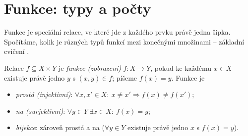 \documentclass[11pt,a4paper]{article}
\begin{document}
\section{Funkce: typy a počty}

Funkce je speciální relace, ve které jde z každého prvku právě jedna šipka. Spočítáme, kolik je různých typů funkcí mezi konečnými množinami -- základní cvičení .

\begin{definice}
Relace $f\subseteq X\times Y$ je \emph{funkce (zobrazení)} $f\colon X\to Y$, pokud ke každému $x\in X$ existuje právě jedno $y$ s $(x,y)\in f$; píšeme $f(x)=y$. Funkce je
\begin{itemize}
  \item \emph{prostá (injektivní)}: $\forall x,x'\in X:\ x\neq x'\Rightarrow f(x)\neq f(x')$;
  \item \emph{na (surjektivní)}: $\forall y\in Y\ \exists x\in X:\ f(x)=y$;
  \item \emph{bijekce}: zároveň prostá a na ($\forall y\in Y$ existuje právě jedno $x$ s $f(x)=y$).
\end{itemize}
\end{definice}
\end{document}
